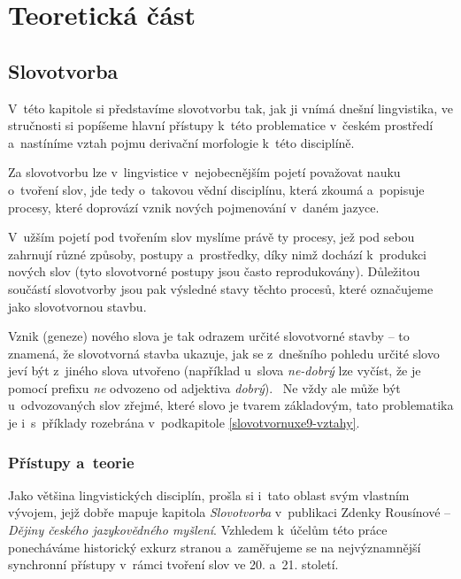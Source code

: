 \part{Teoretická část}

\hypertarget{slovotvorba}{%
\chapter{Slovotvorba}\label{slovotvorba}}

V~této kapitole si představíme slovotvorbu tak, jak ji vnímá dnešní
lingvistika, ve stručnosti si popíšeme hlavní přístupy k~této
problematice v~českém prostředí a~nastíníme vztah pojmu derivační
morfologie k~této disciplíně.

Za slovotvorbu lze v~lingvistice v~nejobecnějším pojetí považovat nauku
o~tvoření slov, jde tedy o~takovou vědní disciplínu, která zkoumá
a~popisuje procesy, které doprovází vznik nových pojmenování v~daném
jazyce.

V~užším pojetí pod tvořením slov myslíme právě ty procesy, jež pod sebou
zahrnují různé způsoby, postupy a~prostředky, díky nimž dochází
k~produkci nových slov (tyto slovotvorné postupy jsou často
reprodukovány). Důležitou součástí slovotvorby jsou pak výsledné stavy
těchto procesů, které označujeme jako slovotvornou stavbu.
\parencite[92]{dokulil00}

Vznik (geneze) nového slova je tak odrazem určité slovotvorné stavby --
to znamená, že slovotvorná stavba ukazuje, jak se z~dnešního pohledu
určité slovo jeví být z~jiného slova utvořeno (například u~slova
\emph{ne-dobrý} lze vyčíst, že je pomocí prefixu \emph{ne} odvozeno od
adjektiva \emph{dobrý}).~\parencite[92--93]{dokulil00} Ne vždy ale může
být u~odvozovaných slov zřejmé, které slovo je tvarem základovým, tato
problematika je i~s~příklady rozebrána v~podkapitole
\ref{slovotvornuxe9-vztahy}.

\hypertarget{pux159uxedstupy-a-teorie}{%
\section{Přístupy a~teorie}\label{pux159uxedstupy-a-teorie}}

Jako většina lingvistických disciplín, prošla si i~tato oblast svým
vlastním vývojem, jejž dobře mapuje kapitola \emph{Slovotvorba}
v~publikaci Zdenky Rousínové -- \emph{Dějiny českého jazykovědného
myšlení}. Vzhledem k~účelům této práce ponecháváme historický exkurz
stranou a~zaměřujeme se na nejvýznamnější synchronní přístupy v~rámci
tvoření slov ve 20. a~21. století.

